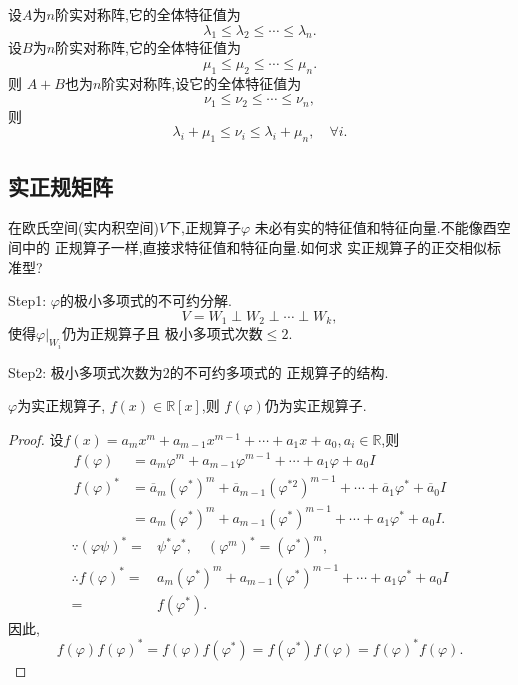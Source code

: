 \begin{theorem}[Weyl摄动定理]\label{thm:Complex-normal-operator7}
  设$A$为$n$阶实对称阵,它的全体特征值为
  \[
    \lambda_1 \leq \lambda_2 \leq \cdots \leq \lambda_n.
  \]
  设$B$为$n$阶实对称阵,它的全体特征值为
  \[
    \mu_1 \leq \mu_2 \leq \cdots \leq \mu_n.
  \]
  则
  $A+B$也为$n$阶实对称阵,设它的全体特征值为
  \[
    \nu_1 \leq \nu_2 \leq \cdots \leq \nu_n,
  \]
  则
  \[
    \lambda_i + \mu_1 \leq \nu_i \leq \lambda_i + \mu_n, \quad \forall i.
  \]
\end{theorem}

\subsection{实正规矩阵}
在欧氏空间(实内积空间)$V$下,正规算子$\varphi$
未必有实的特征值和特征向量.不能像酉空间中的
正规算子一样,直接求特征值和特征向量.如何求
实正规算子的正交相似标准型?

Step1: $\varphi$的极小多项式的不可约分解.
\[
  V=W_1\perp W_2\perp \cdots \perp W_k,
\]
使得$\varphi|_{W_i}$仍为正规算子且
极小多项式次数$\leq 2$.

Step2: 极小多项式次数为$2$的不可约多项式的
正规算子的结构.

\begin{theory}\label{thr:Real-normal-matrix1}
  $\varphi$为实正规算子, $f(x)\in\mathbb{R}[x]$,则
  $f(\varphi)$仍为实正规算子.
\end{theory}

\begin{proof}
  设$f(x)=a_mx^m+a_{m-1}x^{m-1}+\cdots+a_1x+a_0, a_i\in\mathbb{R}$,则
  \begin{align*}
    f(\varphi) & =a_m\varphi^m+a_{m-1}\varphi^{m-1}+\cdots+a_1\varphi+a_0I\\
    f(\varphi)^* & =\overline{a}_m(\varphi^*)^m+\overline{a}_{m-1}(\varphi^{*2})^{m-1}+\cdots+\overline{a}_1\varphi^*+\overline{a}_0I\\
    & = a_m(\varphi^*)^m+a_{m-1}(\varphi^*)^{m-1}+\cdots+a_1\varphi^*+a_0I.
  \end{align*}
  \begin{align*}
    \because (\varphi\psi)^*= & \psi^*\varphi^*, \quad (\varphi^m)^*=(\varphi^*)^m,\\
    \therefore f(\varphi)^*= & a_m(\varphi^*)^m+a_{m-1}(\varphi^*)^{m-1}+\cdots+a_1\varphi^*+a_0I\\
    = & f(\varphi^*).
  \end{align*}
  因此,
  \[
    f(\varphi)f(\varphi)^*=f(\varphi)f(\varphi^*)=f(\varphi^*)f(\varphi)=f(\varphi)^*f(\varphi).
  \]
\end{proof}

